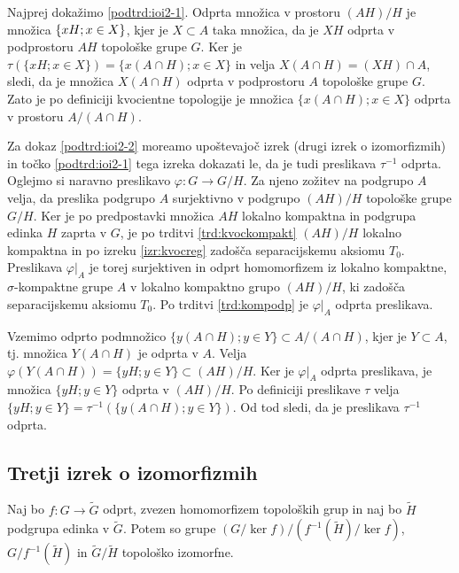 \documentclass[mat1]{fmfdelo}
\begin{document}
\begin{dokaz}
Najprej dokažimo \ref{podtrd:ioi2-1}.
Odprta množica v prostoru $(AH)/H$ je množica $\lbrace xH ; \break x\in X \rbrace$, kjer je $X \subset A$ taka množica, da je $XH$ odprta v podprostoru $AH$ topološke grupe $G$. Ker je $\tau(\lbrace xH ; x \in X \rbrace) = \lbrace x(A \cap H) ; x \in X \rbrace$ in velja $X(A \cap H) = (XH)\cap A$, sledi, da je množica $X(A \cap H)$ odprta v podprostoru $A$ topološke grupe $G$. Zato je po definiciji kvocientne topologije je množica $\lbrace x(A\cap H) ; x \in X \rbrace$ odprta v prostoru $A/(A \cap H)$.

Za dokaz \ref{podtrd:ioi2-2} moreamo upoštevajoč izrek (drugi izrek o izomorfizmih) in točko \ref{podtrd:ioi2-1} tega izreka dokazati le, da je tudi preslikava $\tau^{-1}$ odprta.
Oglejmo si naravno preslikavo $\varphi\colon G \to G/H$. Za njeno zožitev na podgrupo $A$ velja, da preslika podgrupo $A$ surjektivno v podgrupo $(AH)/H$ topološke grupe $G/H$. Ker je po predpostavki množica $AH$ lokalno kompaktna in podgrupa edinka $H$ zaprta v $G$, je po trditvi \ref{trd:kvockompakt} $(AH)/H$ lokalno kompaktna in po izreku \ref{izr:kvocreg} zadošča separacijskemu aksiomu $T_0$. Preslikava $\varphi|_A$ je torej surjektiven in odprt homomorfizem iz lokalno kompaktne, $\sigma$-kompaktne grupe $A$ v lokalno kompaktno grupo $(AH)/H$, ki zadošča separacijskemu aksiomu $T_0$. Po trditvi \ref{trd:kompodp} je $\varphi|_A$ odprta preslikava.

Vzemimo odprto podmnožico $\lbrace y(A \cap H) ; y \in Y \rbrace \subset A/(A \cap H)$, kjer je $Y \subset A$, tj. množica $Y(A \cap H)$ je odprta v $A$. Velja $\varphi(Y(A \cap H)) = \lbrace yH ; y \in Y \rbrace \subset (AH)/H$. Ker je $\varphi|_A$ odprta preslikava, je množica $\lbrace yH ; y \in Y \rbrace$ odprta v $(AH)/H$. Po definiciji preslikave $\tau$ velja $\lbrace yH ; y \in Y \rbrace = \tau^{-1}(\lbrace y(A \cap H) ; y \in Y \rbrace)$. Od tod sledi, da je preslikava $\tau^{-1}$ odprta.
\end{dokaz}


\subsection{Tretji izrek o izomorfizmih}
\begin{izrek}\label{izr:predtretji}
	Naj bo $f\colon G \to \widetilde{G}$ odprt, zvezen homomorfizem topoloških grup in naj bo $\widetilde{H}$ podgrupa edinka v $\widetilde{G}$. Potem so grupe $(G/\ker f)/(f^{-1}(\widetilde{H})/\ker f)$, $G/f^{-1}(\widetilde{H})$ in $\widetilde{G}/\widetilde{H}$ topološko izomorfne.
\end{izrek}
\end{document}
